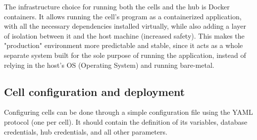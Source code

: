 The infrastructure choice for running both the cells and the hub is Docker containers. It allows running the cell's program as a containerized application, with all the necessary dependencies installed virtually, while also adding a layer of isolation between it and the host machine (increased safety). This makes the "production" environment more predictable and stable, since it acts as a whole separate system built for the sole purpose of running the application, instead of relying in the host's OS (Operating System) and running bare-metal.


\subsection{Cell configuration and deployment}


Configuring cells can be done through a simple configuration file using the YAML protocol (one per cell). It should contain the definition of its variables, database credentials, hub credentials, and all other parameters. %

